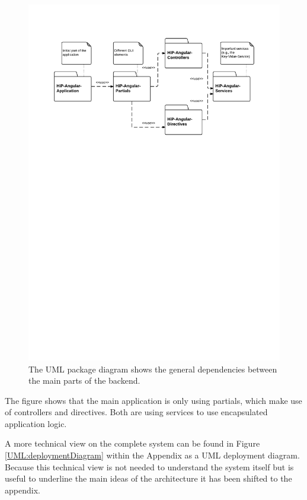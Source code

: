 \begin{figure}[ht]
\centerline{\includegraphics[width=1\textwidth]{gfx/Components_dia}}
\caption{The \ac{UML} package diagram shows the general dependencies between the main parts of the backend.}
\label{UML:Packages}
\end{figure} 

The figure shows that the main application is only using partials, which make use of controllers and directives. Both are using services to use encapsulated application logic.

A more technical view on the complete system can be found in Figure \ref{UML:deploymentDiagram} within the Appendix as a \ac{UML} deployment diagram. Because this technical view is not needed to understand the system itself but is useful to underline the main ideas of the architecture it has been shifted to the appendix.

